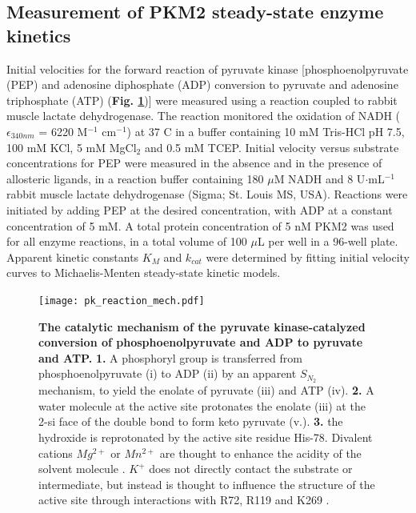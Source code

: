 \subsection{Measurement of PKM2 steady-state enzyme kinetics}
\label{subsec:methods_pkm2_activity}
Initial velocities for the forward reaction of pyruvate kinase [phosphoenolpyruvate (PEP) and adenosine diphosphate (ADP) conversion to pyruvate and adenosine triphosphate (ATP) (\textbf{Fig. \ref{fig:pk_reaction_mech}})] were measured using a reaction coupled to rabbit muscle lactate dehydrogenase. The reaction monitored the oxidation of NADH ($\epsilon _{340 nm}$ = 6220 M$^{-1}$ cm$^{-1}$) at 37 \textdegree C in a buffer containing 10 mM Tris-HCl pH 7.5, 100 mM KCl, 5 mM MgCl$_{2}$ and 0.5 mM TCEP. Initial velocity versus substrate concentrations for PEP were measured in the absence and in the presence of allosteric ligands, in a reaction buffer containing 180 $\mu$M NADH and 8 U$\cdot$mL$^{-1}$ rabbit muscle lactate dehydrogenase (Sigma; St. Louis MS, USA). Reactions were initiated by adding PEP at the desired concentration, with ADP at a constant concentration of 5 mM. A total protein concentration of 5 nM PKM2 was used for all enzyme reactions, in a total volume of 100 $\mu$L per well in a 96-well plate. Apparent kinetic constants $K_{M}$ and $k_{cat}$ were determined by fitting initial velocity curves to Michaelis-Menten steady-state kinetic models. 
%
%
%
%
%
\begin{figure}[!ht]
\centering
\texttt{[image: pk\_reaction\_mech.pdf]}
\caption[The catalytic mechanism of the pyruvate kinase-catalyzed conversion of phosphoenolpyruvate and ADP to pyruvate and ATP.]{\textbf{The catalytic mechanism of the pyruvate kinase-catalyzed conversion of phosphoenolpyruvate and ADP to pyruvate and ATP.} \textbf{1.} A phosphoryl group is transferred from phosphoenolpyruvate (i) to ADP (ii) by an apparent $S_{N_{2}}$ mechanism, to yield the enolate of pyruvate (iii) and ATP (iv). \textbf{2.} A water molecule at the active site protonates the enolate (iii) at the 2-si face of the double bond to form keto pyruvate (v.). \textbf{3.} the hydroxide is reprotonated by the active site residue His-78. Divalent cations $Mg^{2+}$ or $Mn^{2+}$ are thought to enhance the acidity of the solvent molecule \protect\cite{Hollenberg:1971aa}. $K^{+}$ does not directly contact the substrate or intermediate, but instead is thought to influence the structure of the active site through interactions with R72, R119 and K269 \protect\cite{Dombrauckas:2005aa}.}
\label{fig:pk_reaction_mech}
\end{figure}
\clearpage


